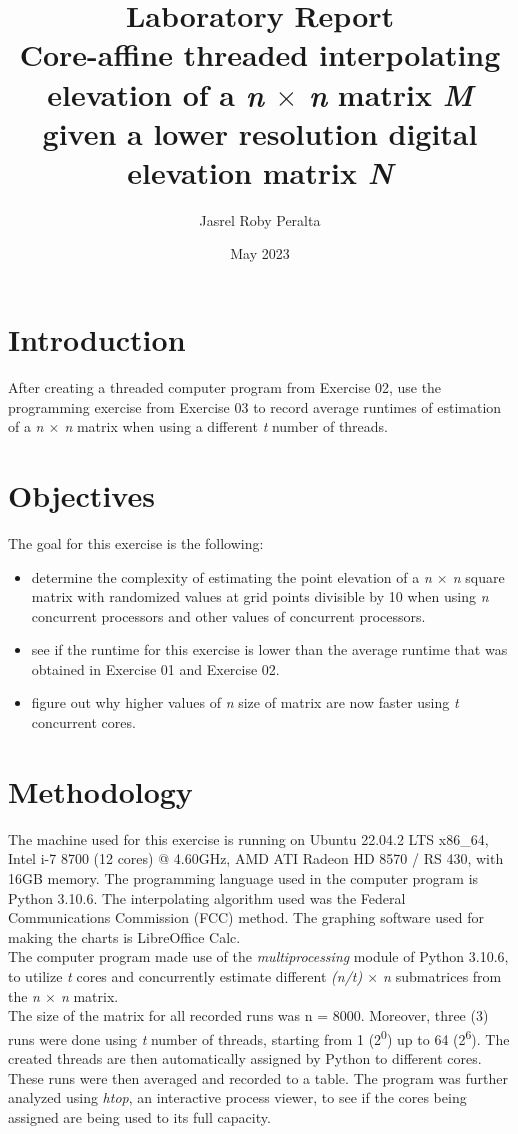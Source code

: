 \documentclass{article}
\title{
\textbf{Laboratory Report} \\
\large Core-affine threaded interpolating elevation of a \emph{n $\times$ n} matrix \emph{M} given a lower resolution digital elevation matrix \emph{N}
}
\author{Jasrel Roby Peralta}
\date{May 2023}
\begin{document}
\maketitle

\section*{Introduction}
\hspace{\parindent} After creating a threaded computer program from Exercise 02, use the programming exercise from Exercise 03 to record average runtimes of estimation of a \emph{n $\times$ n} matrix when using a different \emph{t} number of threads.

\section*{Objectives}
The goal for this exercise is the following:
\begin{itemize}
    \item determine the complexity of estimating the point elevation of a \emph{n $\times$ n} square matrix with randomized values at grid points divisible by 10 when using \emph{n} concurrent processors and other values of concurrent processors.
    \item see if the runtime for this exercise is lower than the average runtime that was obtained in Exercise 01 and Exercise 02.
    \item figure out why higher values of \emph{n} size of matrix are now faster using \emph{t} concurrent cores.
\end{itemize}

\section*{Methodology}
\hspace{\parindent} The machine used for this exercise is running on Ubuntu 22.04.2 LTS x86\_64, Intel i-7 8700 (12 cores) @ 4.60GHz, AMD ATI Radeon HD 8570 / RS 430, with 16GB memory. The programming language used in the computer program is Python 3.10.6. The interpolating algorithm used was the Federal Communications Commission (FCC) method. The graphing software used for making the charts is LibreOffice Calc. \\
\indent The computer program made use of the \emph{multiprocessing} module of Python 3.10.6, to utilize \emph{t} cores and concurrently estimate different \emph{(n/t) $\times$ n} submatrices from the \emph{n $\times$ n} matrix. \\ 
\indent The size of the matrix for all recorded runs was n = 8000. Moreover, three (3) runs were done using \emph{t} number of threads, starting from 1 (2\textsuperscript{0}) up to 64 (2\textsuperscript{6}). The created threads are then automatically assigned by Python to different cores. These runs were then averaged and recorded to a table.
\indent The program was further analyzed using \emph{htop}, an interactive process viewer, to see if the cores being assigned are being used to its full capacity.
\end{document}
